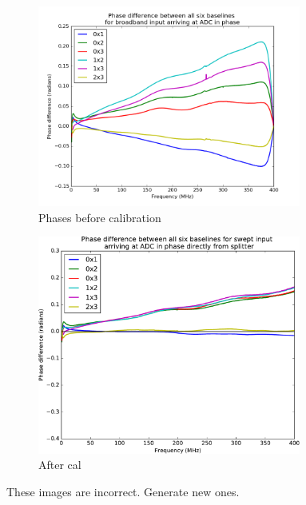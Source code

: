 \begin{figure}
  \centering
  \begin{subfigure}[b]{0.8\textwidth}
    \centering
    \includegraphics[clip=true, width=0.95\textwidth]{freq-shift-in-phase}
    \caption{Phases before calibration}
  \end{subfigure}
  \begin{subfigure}[b]{0.8\textwidth}
    \centering
    \includegraphics[clip=true, width=0.95\textwidth]{freq-shift-direct}
    \caption{After cal}
  \end{subfigure}
  \caption{These images are incorrect. Generate new ones.}
\end{figure}

